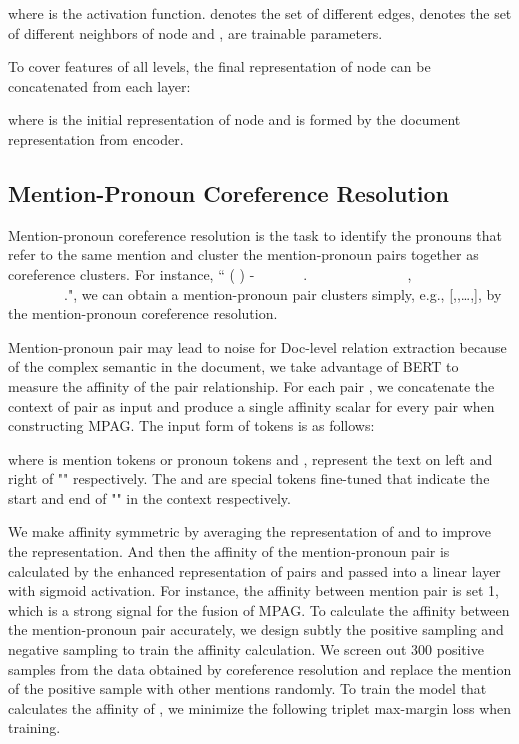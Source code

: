 \documentclass{article}
\begin{document}
where  is the activation function.  denotes the set of different edges,  denotes the set of different neighbors of node  and ,  are trainable parameters.

To cover features of all levels, the final representation of node  can be concatenated from each layer:



where  is the initial representation of node  and is formed by the document representation from encoder.

\subsection{Mention-Pronoun Coreference Resolution}

Mention-pronoun coreference resolution is the task to identify the pronouns that refer to the same mention and cluster the mention-pronoun pairs together as coreference clusters. For instance, ``  (  )   -~~~~~~~.~~ ~~~~~~~~ ~~~, ~~~~~ ~~~~~~~~.", we can obtain a mention-pronoun pair clusters simply, e.g., [,,\dots,], by the mention-pronoun coreference resolution. 

Mention-pronoun pair may lead to noise for Doc-level relation extraction because of the complex semantic in the document, we take advantage of BERT to measure the affinity of the  pair relationship. For each pair , we concatenate the context of  pair as input and produce a single affinity scalar for every pair when constructing MPAG. The input form of tokens is as follows:



where  is mention tokens or pronoun tokens and  ,  represent the text on left and right of "" respectively. The  and  are special tokens fine-tuned that indicate the start and end of "" in the context respectively. 

We make affinity symmetric by averaging the representation of  and  to improve the representation. And then the affinity of the mention-pronoun pair is calculated by the enhanced representation of pairs and passed into a linear layer with sigmoid activation. For instance, the affinity between mention pair  is set 1, which is a strong signal for the fusion of MPAG. To calculate the affinity between the mention-pronoun pair accurately, we design subtly the positive sampling and negative sampling to train the affinity calculation. We screen out 300 positive samples  from the data  obtained by coreference resolution and replace the mention  of the positive sample with other mentions  randomly. To train the model that calculates the affinity of , we minimize the following triplet max-margin loss when training.
\end{document}
